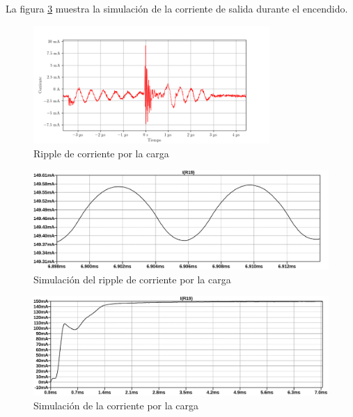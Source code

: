 La figura \ref{fig:sim:14} muestra la simulación de la corriente de salida durante el encendido.


\begin{figure}[H]
    \centering
    \includegraphics[width=0.8\textwidth]{images/capturas-osciloscopio/17-11-2022/67.png}
    \caption{Ripple de corriente por la carga}
    \label{fig:osc:67}
\end{figure}

\begin{figure}[H]
    \centering
    \includegraphics[width=\textwidth]{images/sim/14-ripple.pdf}
    \caption{Simulación del ripple de corriente por la carga}
    \label{fig:sim:14ripple}
\end{figure}

\begin{figure}[H]
    \centering
    \includegraphics[width=\textwidth]{images/sim/14.pdf}
    \caption{Simulación de la corriente por la carga}
    \label{fig:sim:14}
\end{figure}

